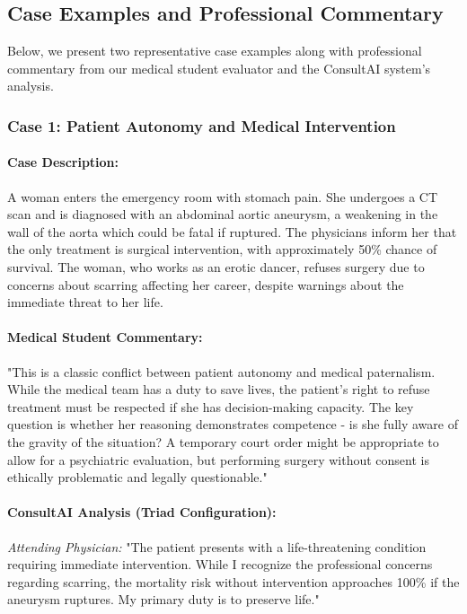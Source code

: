 \documentclass[11pt]{article}
\begin{document}
\subsection{Case Examples and Professional Commentary}

Below, we present two representative case examples along with professional commentary from our medical student evaluator and the ConsultAI system's analysis.

\subsubsection{Case 1: Patient Autonomy and Medical Intervention}

\paragraph{Case Description:} A woman enters the emergency room with stomach pain. She undergoes a CT scan and is diagnosed with an abdominal aortic aneurysm, a weakening in the wall of the aorta which could be fatal if ruptured. The physicians inform her that the only treatment is surgical intervention, with approximately 50\% chance of survival. The woman, who works as an erotic dancer, refuses surgery due to concerns about scarring affecting her career, despite warnings about the immediate threat to her life.

\paragraph{Medical Student Commentary:} "This is a classic conflict between patient autonomy and medical paternalism. While the medical team has a duty to save lives, the patient's right to refuse treatment must be respected if she has decision-making capacity. The key question is whether her reasoning demonstrates competence - is she fully aware of the gravity of the situation? A temporary court order might be appropriate to allow for a psychiatric evaluation, but performing surgery without consent is ethically problematic and legally questionable."

\paragraph{ConsultAI Analysis (Triad Configuration):}

\textit{Attending Physician:} "The patient presents with a life-threatening condition requiring immediate intervention. While I recognize the professional concerns regarding scarring, the mortality risk without intervention approaches 100\% if the aneurysm ruptures. My primary duty is to preserve life."
\end{document}
